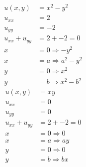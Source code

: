 \documentclass[../../HW07.tex]{subfiles}
\begin{document}
\begin{align*}
    u(x,y)        & =x^{2}-y^{2}                  \\
    u_{xx}        & = 2                           \\
    u_{yy}        & = -2                          \\
    u_{xx}+u_{yy} & = 2 + -2 = 0                  \\
    x             & =0 \Rightarrow -y^{2}         \\
    x             & =a \Rightarrow a^{2} - y^{2}  \\
    y             & = 0 \Rightarrow x^{2}         \\
    y             & = b \Rightarrow x^{2} - b^{2}
\end{align*}
\begin{align*}
    u(x,y)        & = xy               \\
    u_{xx}        & = 0                \\
    u_{yy}        & = 0                \\
    u_{xx}+u_{yy} & = 2 + -2 = 0       \\
    x             & =0 \Rightarrow 0   \\
    x             & =a \Rightarrow ay  \\
    y             & = 0 \Rightarrow 0 \\
    y             & = b \Rightarrow bx
\end{align*}
\end{document}
